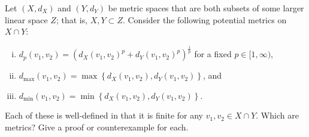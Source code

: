 \documentclass[11pt,letterpaper]{article}
\newenvironment{prob}[1]
  {\renewcommand\theinnerprob{#1}\innerprob}
  {\endinnerprob}
\begin{document}
\begin{prob}{1}  %
Let $(X,d_X)$ and $(Y,d_Y)$ be metric spaces that are both subsets of some larger linear space $Z$; that is, $X,Y\subset Z$.  Consider the following potential metrics on $X\cap Y$:
\begin{enumerate}[(i)]
	\item $d_p(v_1,v_2) = \left( d_X(v_1,v_2)^p + d_Y(v_1,v_2)^p\right)^\frac{1}{p}$ for a fixed $p\in [1,\infty)$,
	\item $d_{\max}(v_1,v_2) = \max\left\{ d_X(v_1,v_2), d_Y(v_1,v_2)\right\}$, and
	\item $d_{\min}(v_1,v_2) = \min\left\{ d_X(v_1,v_2), d_Y(v_1,v_2)\right\}$.
\end{enumerate}
Each of these is well-defined in that it is finite for any $v_1,v_2\in X\cap Y$.  Which are metrics?  Give a proof or counterexample for each.
\end{prob}
\end{document}
